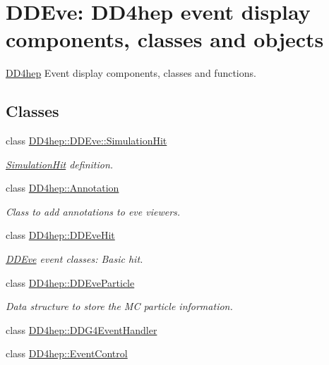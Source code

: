 \hypertarget{group___d_d4_h_e_p___e_v_e}{}\section{D\+D\+Eve\+: D\+D4hep event display components, classes and objects}
\label{group___d_d4_h_e_p___e_v_e}


\hyperlink{namespace_d_d4hep}{D\+D4hep} Event display components, classes and functions.  


\subsection*{Classes}
\begin{DoxyCompactItemize}
\item 
class \hyperlink{class_d_d4hep_1_1_d_d_eve_1_1_simulation_hit}{D\+D4hep\+::\+D\+D\+Eve\+::\+Simulation\+Hit}
\begin{DoxyCompactList}\small\item\em \hyperlink{class_d_d4hep_1_1_d_d_eve_1_1_simulation_hit}{Simulation\+Hit} definition. \end{DoxyCompactList}\item 
class \hyperlink{class_d_d4hep_1_1_annotation}{D\+D4hep\+::\+Annotation}
\begin{DoxyCompactList}\small\item\em Class to add annotations to eve viewers. \end{DoxyCompactList}\item 
class \hyperlink{class_d_d4hep_1_1_d_d_eve_hit}{D\+D4hep\+::\+D\+D\+Eve\+Hit}
\begin{DoxyCompactList}\small\item\em \hyperlink{struct_d_d4hep_1_1_d_d_eve}{D\+D\+Eve} event classes\+: Basic hit. \end{DoxyCompactList}\item 
class \hyperlink{class_d_d4hep_1_1_d_d_eve_particle}{D\+D4hep\+::\+D\+D\+Eve\+Particle}
\begin{DoxyCompactList}\small\item\em Data structure to store the MC particle information. \end{DoxyCompactList}\item 
class \hyperlink{class_d_d4hep_1_1_d_d_g4_event_handler}{D\+D4hep\+::\+D\+D\+G4\+Event\+Handler}
\item 
class \hyperlink{class_d_d4hep_1_1_event_control}{D\+D4hep\+::\+Event\+Control}

\end{DoxyCompactItemize}
